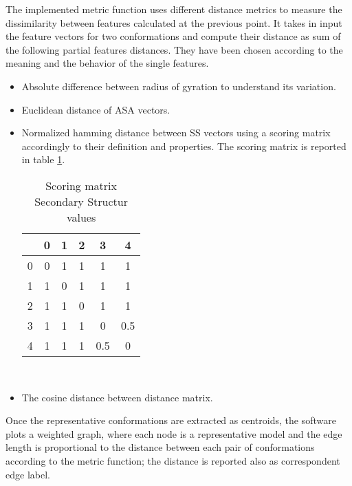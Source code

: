 \medskip
The implemented metric function uses different distance metrics to measure the dissimilarity between features calculated at the previous point. It takes in input the feature vectors for two conformations and compute their distance as sum of the following partial features distances. They have been chosen according to the meaning and the behavior of the single features.
\begin{itemize}
\item Absolute difference between radius of gyration to understand its variation.
\item Euclidean distance of ASA vectors.
\item Normalized hamming distance between SS vectors using a scoring matrix accordingly to their definition and properties. The scoring matrix is reported in table \ref{tab:score}. 

\begin{table}[H]
\begin{center}
\begin{tabular}{c|ccccc}
& 0 & 1 & 2 & 3 & 4 \\
\hline
0 & 0 & 1 & 1 & 1 & 1\\
1 & 1 & 0 & 1 & 1 & 1\\
2 & 1 & 1 & 0 & 1 & 1\\
3 & 1 & 1 & 1 & 0 & 0.5\\
4 & 1 & 1 & 1 & 0.5 & 0\\
\end{tabular}
\end{center}
\caption{Scoring matrix Secondary Structur values}~\label{tab:score}
\end{table}

\item The cosine distance between distance matrix. 
\end{itemize}


Once the representative conformations are extracted as centroids, the software plots a weighted graph, where each node is a representative model and the edge length is proportional to the distance between each pair of conformations according to the metric function; the distance is reported also as correspondent edge label.



